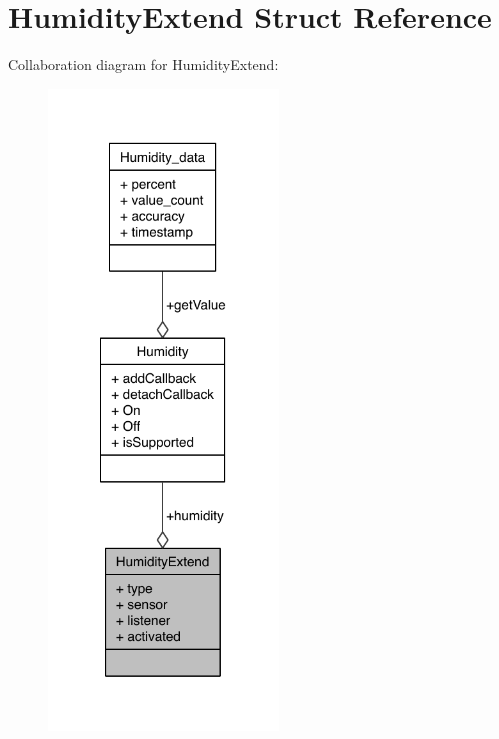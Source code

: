 \section{Humidity\-Extend Struct Reference}
\label{structHumidityExtend}


Collaboration diagram for Humidity\-Extend\-:
\nopagebreak
\begin{figure}[H]
\begin{center}
\leavevmode
\includegraphics[width=173pt]{structHumidityExtend__coll__graph}
\end{center}
\end{figure}
